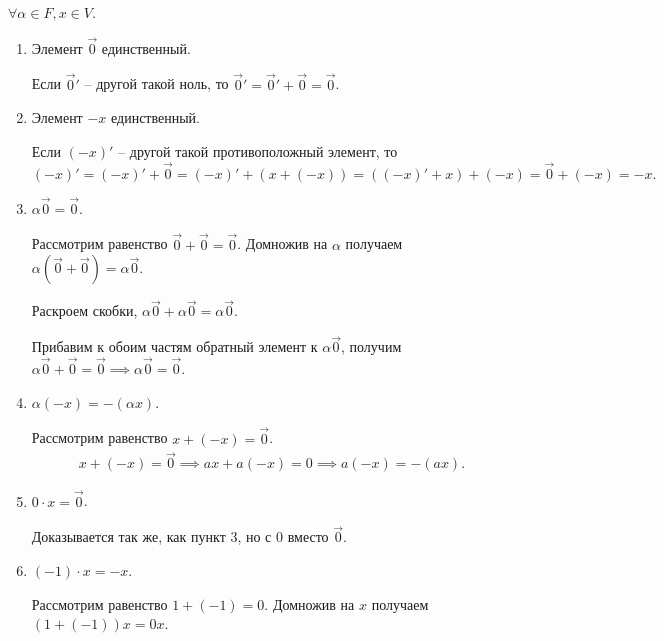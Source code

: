 \documentclass[a4paper]{article}
\begin{document}
\begin{colloq}
            $\forall \alpha \in F, x \in V$.
            \begin{enumerate}
            \item Элемент $\overrightarrow{0}$ единственный.

                Если $\overrightarrow{0}'$ -- другой такой ноль, то $\overrightarrow{0}' = \overrightarrow{0}' + \overrightarrow{0} = \overrightarrow{0}$.

            \item Элемент $-x$ единственный.

                Если $(-x)'$ -- другой такой противоположный элемент, то
                \begin{equation*}
                    (-x)' = (-x)' + \overrightarrow{0} = (-x)' + (x + (-x)) = ((-x)' + x) + (-x) = \overrightarrow{0} + (-x) = -x
                .\end{equation*}
                
            \item $\alpha \overrightarrow{0} = \overrightarrow{0}$.

                \newcommand{\zr}{\overrightarrow{0}}
                Рассмотрим равенство $\zr + \zr = \zr$. Домножив на $\alpha$ получаем $\alpha(\zr + \zr) = \alpha\zr$.

                Раскроем скобки, $\alpha\zr + \alpha\zr = \alpha\zr$. 

                Прибавим к обоим частям обратный элемент к $\alpha\zr$, получим $\alpha\zr + \zr = \zr \implies \alpha\zr = \zr$.

            \item $\alpha (-x) = -(\alpha x)$.

                Рассмотрим равенство $x + (-x) = \overrightarrow{0}$.
                \begin{align*}
                    x + (-x) = \overrightarrow{0} \implies ax + a(-x) = 0 \implies a(-x) = -(ax)
                .\end{align*}

            \item $0 \cdot x = \overrightarrow{0}$.

                Доказывается так же, как пункт 3, но с 0 вместо $\zr$.

            \item $(-1) \cdot x = -x$.

                Рассмотрим равенство $1 + (-1) = 0$. Домножив на $x$ получаем $(1 + (-1))x = 0x$.


\end{enumerate}
\end{colloq}
\end{document}
